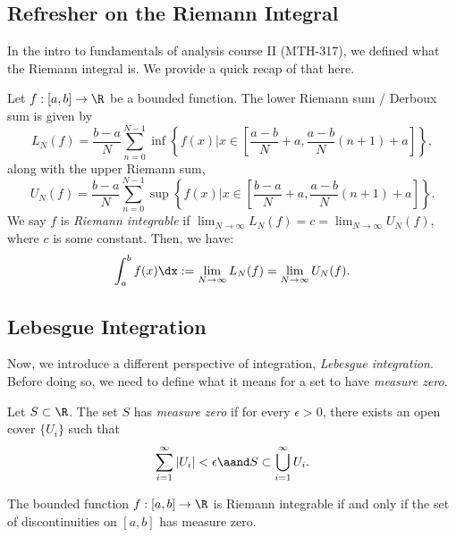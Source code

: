 
\subsection{Refresher on the Riemann Integral}

In the intro to fundamentals of analysis course II (MTH-317), we defined what the Riemann integral is. We provide a quick recap of that here.

\begin{definition}
  Let $f : [a, b] \to \R$ be a bounded function. The lower Riemann sum / Derboux sum is given by
  \[%
    L_N(f) = \frac{b - a}{N} \sum_{n=0}^{N-1} \inf\left\{f(x) | x \in \left[\frac{a - b}{N} + a, \frac{a - b}{N}(n+1) + a\right]\right\}
  ,\]%
  along with the upper Riemann sum,
  \[%
    U_N(f) = \frac{b - a}{N} \sum_{n=0}^{N-1} \sup\left\{f(x) | x \in \left[\frac{b - a}{N} + a, \frac{a - b}{N}(n+1) + a\right]\right\}
  .\]%
  We say $f$ is \emph{Riemann integrable} if $\lim_{N \to \infty} L_N(f) = c = \lim_{N \to \infty} U_N(f)$, where $c$ is some constant. Then, we have:
  \[%
    \int_a^b f(x) \dx := \lim_{N \to \infty} L_N(f) = \lim_{N \to \infty} U_N(f)
  .\]%
\end{definition}

\subsection{Lebesgue Integration}

Now, we introduce a different perspective of integration, \emph{Lebesgue integration}. Before doing so, we need to define what it means for a set to have \emph{measure zero}.
\begin{definition}
  Let $S \subset \R$. The set $S$ has \emph{measure zero} if for every $\epsilon > 0$, there exists an open cover $\{U_i\}$ such that
  \[%
    \sum_{i=1}^{\infty} |U_i| < \epsilon \aand S \subset \bigcup_{i=1}^{\infty} U_i
  .\]%
\end{definition}

\begin{theorem}
  The bounded function $f : [a, b] \to \R$ is Riemann integrable if and only if the set of discontinuities on $[a, b]$ has measure zero.
\end{theorem}

